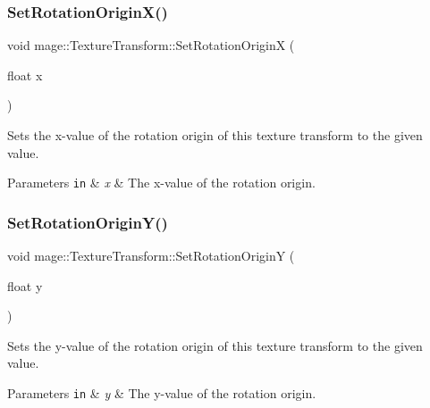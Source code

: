 \subsubsection{\texorpdfstring{Set\+Rotation\+Origin\+X()}{SetRotationOriginX()}}
{\footnotesize\ttfamily void mage\+::\+Texture\+Transform\+::\+Set\+Rotation\+OriginX (\begin{DoxyParamCaption}\item[{float}]{x }\end{DoxyParamCaption})\hspace{0.3cm}{\ttfamily [noexcept]}}

Sets the x-\/value of the rotation origin of this texture transform to the given value.


\begin{DoxyParams}[1]{Parameters}
\mbox{\tt in}  & {\em x} & The x-\/value of the rotation origin. \\
\hline
\end{DoxyParams}
\hypertarget{structmage_1_1_texture_transform_a6f045235afb5e5ede874a3f7e2203475}{}\label{structmage_1_1_texture_transform_a6f045235afb5e5ede874a3f7e2203475} 
\subsubsection{\texorpdfstring{Set\+Rotation\+Origin\+Y()}{SetRotationOriginY()}}
{\footnotesize\ttfamily void mage\+::\+Texture\+Transform\+::\+Set\+Rotation\+OriginY (\begin{DoxyParamCaption}\item[{float}]{y }\end{DoxyParamCaption})\hspace{0.3cm}{\ttfamily [noexcept]}}

Sets the y-\/value of the rotation origin of this texture transform to the given value.


\begin{DoxyParams}[1]{Parameters}
\mbox{\tt in}  & {\em y} & The y-\/value of the rotation origin. \\
\hline
\end{DoxyParams}
\hypertarget{structmage_1_1_texture_transform_a836feabb051b7879b7d07b7d96ae840b}{}\label{structmage_1_1_texture_transform_a836feabb051b7879b7d07b7d96ae840b} 

